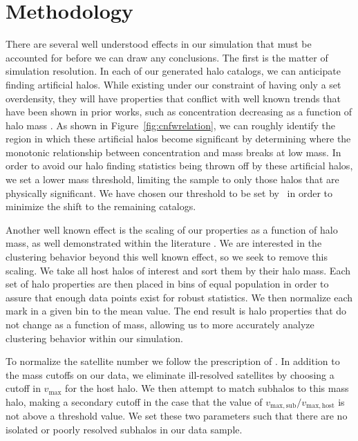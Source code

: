 \documentclass[usenatbib,usegraphicx,letterpaper]{mn2e}
\begin{document}
\section[]{Methodology}
\label{section:methodology}

There are several well understood effects in our simulation that must be accounted for before we can draw any conclusions. The first is the matter of simulation resolution. In each of our generated halo catalogs, we can anticipate finding artificial halos. While existing under our constraint of having only a set overdensity, they will have properties that conflict with well known trends that have been shown in prior works, such as concentration decreasing as a function of halo mass \citep{wechsler06}. As shown in Figure~\ref{fig:cnfwrelation}, we can roughly identify the region in which these artificial halos become significant by determining where the monotonic relationship between concentration and mass breaks at low mass. In order to avoid our halo finding statistics being thrown off by these artificial halos, we set a lower mass threshold, limiting the sample to only those halos that are physically significant. We have chosen our threshold to be set by \simB \ in order to minimize the shift to the remaining catalogs.

Another well known effect is the scaling of our properties as a function of halo mass, as well demonstrated within the literature \citep{duffy08}. We are interested in the clustering behavior beyond this well known effect, so we seek to remove this scaling. We take all host halos of interest and sort them by their halo mass. Each set of halo properties are then placed in bins of equal population in order to assure that enough data points exist for robust statistics. We then normalize each mark in a given bin to the mean value. The end result is halo properties that do not change as a function of mass, allowing us to more accurately analyze clustering behavior within our simulation.

To normalize the satellite number we follow the prescription of \citet{wechsler06}. In addition to the mass cutoffs on our data, we eliminate ill-resolved satellites by choosing a cutoff in $v_{\mathrm{max}}$ for the host halo. We then attempt to match subhalos to this mass halo, making a secondary cutoff in the case that the value of $v_{\mathrm{max,sub}} / v_{\mathrm{max,host}}$ is not above a threshold value. We set these two parameters such that there are no isolated or poorly resolved subhalos in our data sample.
\end{document}
